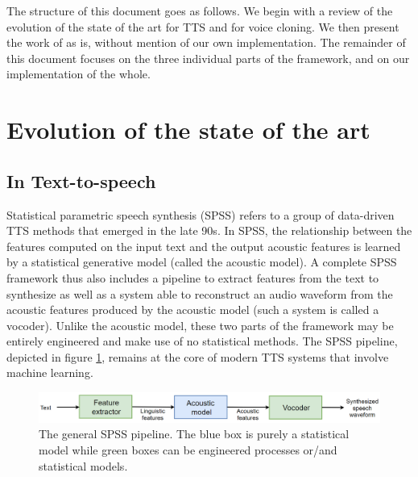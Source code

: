 \documentclass[a4paper, oneside, 12pt, english]{article}
\begin{document}
The structure of this document goes as follows. We begin with a review of the evolution of the state of the art for TTS and for voice cloning. We then present the work of \citep{SV2TTS} as is, without mention of our own implementation. The remainder of this document focuses on the three individual parts of the framework, and on our implementation of the whole.


\section{Evolution of the state of the art}
\subsection{In Text-to-speech}
Statistical parametric speech synthesis (SPSS) refers to a group of data-driven TTS methods that emerged in the late 90s. In SPSS, the relationship between the features computed on the input text and the output acoustic features is learned by a statistical generative model (called the acoustic model). A complete SPSS framework thus also includes a pipeline to extract features from the text to synthesize as well as a system able to reconstruct an audio waveform from the acoustic features produced by the acoustic model (such a system is called a vocoder). Unlike the acoustic model, these two parts of the framework may be entirely engineered and make use of no statistical methods. The SPSS pipeline, depicted in figure \ref{spss_framework}, remains at the core of modern TTS systems that involve machine learning.

\begin{figure}[h]
	\centering
	\includegraphics[width=\linewidth]{images/spss_framework.png}
	\caption{The general SPSS pipeline. The blue box is purely a statistical model while green boxes can be engineered processes or/and statistical models.}
	\label{spss_framework}
\end{figure}
\end{document}
